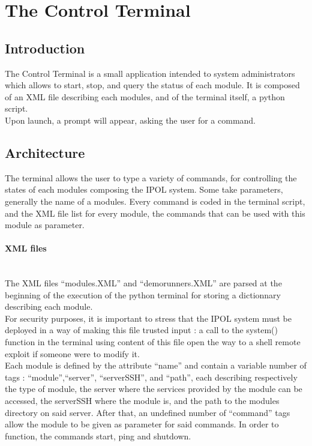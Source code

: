 \section{The Control Terminal}

\subsection{Introduction}
The Control Terminal is a small application intended to system administrators which allows to start, stop, and query the status of each module. It is composed of an XML file describing each modules, and of the terminal itself, a python script. \\
Upon launch, a prompt will appear, asking the user for a command.

\subsection{Architecture}
The terminal allows the user to type a variety of commands, for controlling the states of each modules composing the IPOL system. Some take parameters, generally the name of a modules. Every command is coded in the terminal script, and the XML file list for every module, the commands that can be used with this module as parameter.

\paragraph{XML files} \hspace{0pt} \\
The XML files ``modules.XML'' and ``demorunners.XML'' are parsed at the beginning of the execution of the python terminal for storing a dictionnary describing each module. \\
For security purposes, it is important to stress that the IPOL system must be deployed in a way of making this file trusted input : a call to the system() function in the terminal using content of this file open the way to a shell remote exploit if someone were to modify it. \\
Each module is defined by the attribute ``name'' and contain a variable number of tags : ``module'',``server'', ``serverSSH'', and ``path'', each describing respectively the type of module, the server where the services provided by the module can be accessed, the serverSSH where the module is, and the path to the modules directory on said server. After that, an undefined number of ``command'' tags allow the module to be given as parameter for said commands. In order to function, the commands start, ping and shutdown.

